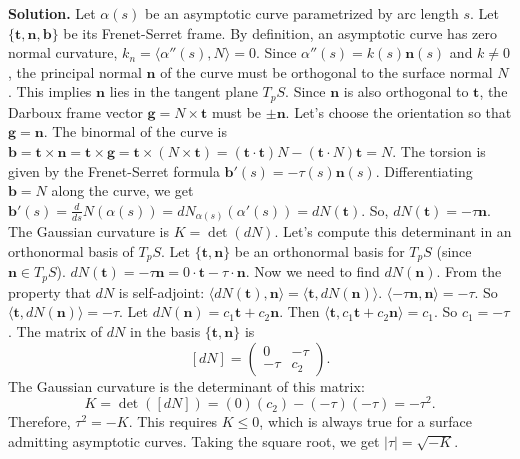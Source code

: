 \documentclass[12pt, a4paper, oneside]{article}
\newenvironment{solution}
  {\par\noindent\textbf{Solution. }\newline}
  {\par}
\begin{document}
\begin{solution}
Let $\alpha(s)$ be an asymptotic curve parametrized by arc length $s$. Let $\{\mathbf{t}, \mathbf{n}, \mathbf{b}\}$ be its Frenet-Serret frame.
By definition, an asymptotic curve has zero normal curvature, $k_n = \langle \alpha''(s), N \rangle = 0$.
Since $\alpha''(s) = k(s)\mathbf{n}(s)$ and $k \neq 0$, the principal normal $\mathbf{n}$ of the curve must be orthogonal to the surface normal $N$. This implies $\mathbf{n}$ lies in the tangent plane $T_pS$.
Since $\mathbf{n}$ is also orthogonal to $\mathbf{t}$, the Darboux frame vector $\mathbf{g} = N \times \mathbf{t}$ must be $\pm\mathbf{n}$. Let's choose the orientation so that $\mathbf{g}=\mathbf{n}$.
The binormal of the curve is $\mathbf{b} = \mathbf{t} \times \mathbf{n} = \mathbf{t} \times \mathbf{g} = \mathbf{t} \times (N \times \mathbf{t}) = ( \mathbf{t} \cdot \mathbf{t} ) N - ( \mathbf{t} \cdot N ) \mathbf{t} = N$.
The torsion is given by the Frenet-Serret formula $\mathbf{b}'(s) = -\tau(s)\mathbf{n}(s)$.
Differentiating $\mathbf{b}=N$ along the curve, we get $\mathbf{b}'(s) = \frac{d}{ds}N(\alpha(s)) = dN_{\alpha(s)}(\alpha'(s)) = dN(\mathbf{t})$.
So, $dN(\mathbf{t}) = -\tau\mathbf{n}$.
The Gaussian curvature is $K = \det(dN)$. Let's compute this determinant in an orthonormal basis of $T_pS$.
Let $\{\mathbf{t}, \mathbf{n}\}$ be an orthonormal basis for $T_pS$ (since $\mathbf{n} \in T_pS$).
$dN(\mathbf{t}) = -\tau\mathbf{n} = 0\cdot\mathbf{t} - \tau\cdot\mathbf{n}$.
Now we need to find $dN(\mathbf{n})$. From the property that $dN$ is self-adjoint:
$\langle dN(\mathbf{t}), \mathbf{n} \rangle = \langle \mathbf{t}, dN(\mathbf{n}) \rangle$.
$\langle -\tau\mathbf{n}, \mathbf{n} \rangle = -\tau$. So $\langle \mathbf{t}, dN(\mathbf{n}) \rangle = -\tau$.
Let $dN(\mathbf{n}) = c_1 \mathbf{t} + c_2 \mathbf{n}$.
Then $\langle \mathbf{t}, c_1 \mathbf{t} + c_2 \mathbf{n} \rangle = c_1$. So $c_1=-\tau$.
The matrix of $dN$ in the basis $\{\mathbf{t}, \mathbf{n}\}$ is
$$ [dN] = \begin{pmatrix} 0 & -\tau \\ -\tau & c_2 \end{pmatrix}. $$
The Gaussian curvature is the determinant of this matrix:
$$ K = \det([dN]) = (0)(c_2) - (-\tau)(-\tau) = -\tau^2. $$
Therefore, $\tau^2 = -K$. This requires $K \le 0$, which is always true for a surface admitting asymptotic curves.
Taking the square root, we get $|\tau| = \sqrt{-K}$.
\end{solution}
\end{document}
